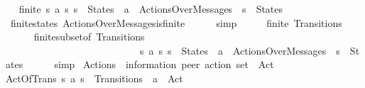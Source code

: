 \begin{isabellebody}
\ \isamarkupfalse%
\ {\isachardoublequoteopen}finite\ {\isacharbraceleft}{\kern0pt}{\isacharparenleft}{\kern0pt}s{}{\isacharcomma}{\kern0pt}\ a{\isacharcomma}{\kern0pt}\ s{}{\isacharparenright}{\kern0pt}{\isachardot}{\kern0pt}\ s{}\ {\isasymin}\ States\ {\isasymand}\ a\ {\isasymin}\ ActionsOverMessages\ {\isasymand}\ s{}\ {\isasymin}\ States{\isacharbraceright}{\kern0pt}{\isachardoublequoteclose}\isanewline
\ \ \ \ \isamarkupfalse%
\ finite{\isacharunderscore}{\kern0pt}states\ ActionsOverMessages{\isacharunderscore}{\kern0pt}is{\isacharunderscore}{\kern0pt}finite\isanewline
\ \ \ \ \isamarkupfalse%
\ simp\isanewline
\ \ \isamarkupfalse%
\ \isamarkupfalse%
\ {\isachardoublequoteopen}finite\ Transitions{\isachardoublequoteclose}\isanewline
\ \ \ \ \isamarkupfalse%
\ finite{\isacharunderscore}{\kern0pt}subset{\isacharbrackleft}{\kern0pt}of\ Transitions\isanewline
\ \ \ \ \ \ \ \ \ \ \ \ \ \ \ \ \ \ \ \ \ \ \ \ \ \ \ {\isachardoublequoteopen}{\isacharbraceleft}{\kern0pt}{\isacharparenleft}{\kern0pt}s{}{\isacharcomma}{\kern0pt}\ a{\isacharcomma}{\kern0pt}\ s{}{\isacharparenright}{\kern0pt}{\isachardot}{\kern0pt}\ s{}\ {\isasymin}\ States\ {\isasymand}\ a\ {\isasymin}\ ActionsOverMessages\ {\isasymand}\ s{}\ {\isasymin}\ States{\isacharbraceright}{\kern0pt}{\isachardoublequoteclose}{\isacharbrackright}{\kern0pt}\isanewline
\ \ \ \ \isamarkupfalse%
\ simp\isanewline
{}\isamarkupfalse%
%
\endisatagproof
{\isafoldproof}%
%
\isadelimproof
\isanewline
%
\endisadelimproof
\isanewline
{}\isamarkupfalse%
\ Actions\ {\isacharcolon}{\kern0pt}{\isacharcolon}{\kern0pt}\ {\isachardoublequoteopen}{\isacharparenleft}{\kern0pt}{\isacharprime}{\kern0pt}information{\isacharcomma}{\kern0pt}\ {\isacharprime}{\kern0pt}peer{\isacharparenright}{\kern0pt}\ action\ set{\isachardoublequoteclose}\ \ {\isacharparenleft}{\kern0pt}{\isachardoublequoteopen}Act{\isachardoublequoteclose}{\isacharparenright}{\kern0pt}\ \isanewline
ActOfTrans{\isacharcolon}{\kern0pt}\ {\isachardoublequoteopen}{\isacharparenleft}{\kern0pt}s{}{\isacharcomma}{\kern0pt}\ a{\isacharcomma}{\kern0pt}\ s{}{\isacharparenright}{\kern0pt}\ {\isasymin}\ Transitions\ {\isasymLongrightarrow}\ a\ {\isasymin}\ Act{\isachardoublequoteclose}\isanewline
\isanewline
{}\isamarkupfalse%

\end{isabellebody}

